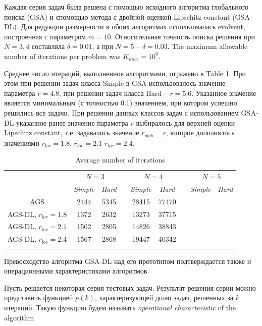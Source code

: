 \documentclass[runningheads]{llncs}
\begin{document}
Каждая серия задач была решена с помощью исходного алгоритма глобального поиска (GSA) и спомощью метода с двойной оценкой Lipschitz constant (GSA-DL). Для редукции размерности в обоих алгоритмах использовалась evolvent, построенная с параметром $m = 10$. Относительная точность поиска решения при $N=3,4$ составляла $\delta = 0.01$, а при $N=5$ -- $\delta = 0.03$. The maximum allowable number of iterations per problem was $K_{max} = 10^6$.

Среднее число итераций, выполненное алгоритмами, отражено в Table \ref{tab:1}.
При этом при решении задач класса Simple в GSA использовалось значение параметра $r=4.8$, при решении задач класса Hard -- $r=5.6$.
Указанное значение является минимальным (с точностью 0.1) значением, при котором успешно решились все задачи.
При решении данных классов задач с использованием GSA-DL указанное ранее значение параметра $r$ выбиралось для верхней оценки Lipschitz constant, т.е. задавалось значение $r_{glob} = r$, которое дополнялось значениями $r_{loc}=1.8$, $r_{loc}=2.1$ $r_{loc}=2.4$.  

\begin{table}
	\caption{Average number of iterations}
	\label{tab:1}
	\center
	\begin{tabular}{ccccccccc}
		\hline\noalign{\smallskip}
		 & \multicolumn{2}{c}{$N=3$} & & \multicolumn{2}{c}{$N=4$} & & \multicolumn{2}{c}{$N=5$}  \\
		\noalign{\smallskip} \cline{2-3} \cline{5-6} \cline{8-9} \noalign{\smallskip}
		 & \textit{Simple} & \textit{Hard} & & \textit{Simple} & \textit{Hard} & & \textit{Simple} & \textit{Hard}  \\
		\noalign{\smallskip} \hline \noalign{\smallskip}
									AGS	&	2444	&	5345	& &	28415	&	77470	& &		&		\\
AGS-DL, $r_{loc}=1.8$	&	1372	&	2632	& &	13273	&	37715	& &		&		\\
AGS-DL, $r_{loc}=2.1$	&	1502	&	2805	& &	14826	&	38843	& &		&		\\
AGS-DL, $r_{loc}=2.4$	&	1567	&	2868	& &	19447	&	40342	& &		&		\\
		\noalign{\smallskip}\hline
	\end{tabular}
\end{table}


Превосходство алгоритма GSA-DL над его прототипом  подтверждается также и операционными характеристиками алгоритмов. 

Пусть решается некоторая серия тестовых задач. Результат решения серии можно представить функцией $p(k)$, характеризующей долю задач, решенных за $k$ итераций. Такую функцию будем называть \textit{operational characteristic} of the algorithm. 
\end{document}
